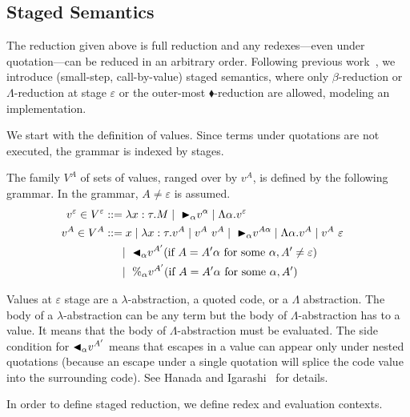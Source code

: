 \subsection{Staged Semantics}

The reduction given above is full reduction and any redexes---even
under quotation---can be reduced in an arbitrary order.
Following previous work~\cite{Hanada2014},
we introduce (small-step, call-by-value) staged semantics,
where only $\beta$-reduction or $\Lambda$-reduction at stage $\varepsilon$ or the outer-most $\blacklozenge$-reduction are allowed,
modeling an implementation.

We start with the definition of values. Since terms under quotations are
not executed, the grammar is indexed by stages.

\begin{definition}[Values]
  The family $V^A$ of sets of values, ranged over by $v^A$,
  is defined by the following grammar.  In the grammar, $A \neq \varepsilon$ is assumed.
  \begin{align*}
    v^\varepsilon \in V^\varepsilon & ::= \lambda x:\tau.M \mid\ {\mathop{\blacktriangleright}}_\alpha v^\alpha \mid \Lambda\alpha.v^\varepsilon                                       & \\
    v^A \in V^A                     & ::= x \mid \lambda x:\tau.v^A \mid v^A\ v^A \mid\ {\mathop{\blacktriangleright}}_\alpha v^{A\alpha} \mid \Lambda\alpha.v^A \mid v^A\ \varepsilon & \\
                                    & \quad\   \mid\ {\mathop{\blacktriangleleft}}_\alpha v^{A'} (\text{if } A = A'\alpha \text{ for some } \alpha, A' \neq \varepsilon)             & \\
                                    & \quad\   \mid\ \%_\alpha v^{A'} (\text{if } A = A'\alpha  \text{ for some } \alpha, A')
  \end{align*}
\end{definition}

Values at $\varepsilon$ stage are a $\lambda$-abstraction, a quoted code,
or a $\Lambda$ abstraction.  The body of a $\lambda$-abstraction can
be any term but the body of $\Lambda$-abstraction has to a value.  It
means that the body of $\Lambda$-abstraction must be evaluated.  The
side condition for ${\mathop{\blacktriangleleft}}_\alpha v^{A'}$ means that escapes in a value
can appear only under nested quotations (because an escape under a
single quotation will splice the code value into the surrounding
code).  See Hanada and Igarashi~\cite{Hanada2014} for details.

In order to define staged reduction, we define redex and evaluation contexts.

